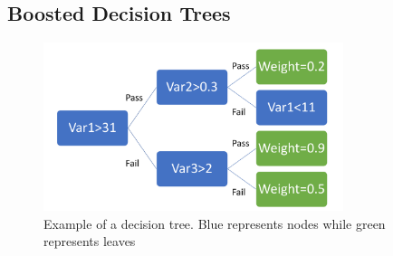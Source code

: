 \subsection{Boosted Decision Trees}

\begin{figure}
  \centering
  \includegraphics[width=0.78\textwidth,keepaspectratio]{HiggsAnalysis/figures/decisiontree}
  \caption[Example of a decision tree]{Example of a decision tree. Blue represents nodes while green represents leaves}
  \label{fig:decisiontree}
\end{figure}

